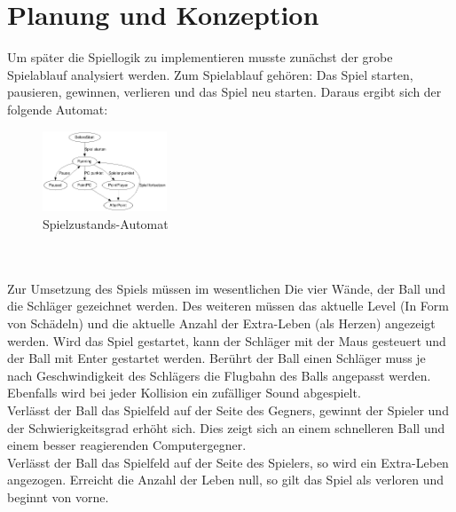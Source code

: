 
\section{Planung und Konzeption}
Um später die Spiellogik zu implementieren musste zunächst der grobe Spielablauf analysiert werden. Zum Spielablauf gehören: Das Spiel starten, pausieren, gewinnen, verlieren und das Spiel neu starten. Daraus ergibt sich der folgende Automat:\\
\begin{figure}[ht]
	\centering
\includegraphics[width=0.33\textwidth]{fsm.png}
\caption{Spielzustands-Automat}
\end{figure}\\\\
Zur Umsetzung des Spiels müssen im wesentlichen Die vier Wände, der Ball und die Schläger gezeichnet werden. Des weiteren müssen das aktuelle Level (In Form von Schädeln) und die aktuelle Anzahl der Extra-Leben (als Herzen) angezeigt werden. Wird das Spiel gestartet, kann der Schläger mit der Maus gesteuert und der Ball mit Enter gestartet werden. Berührt der Ball einen Schläger muss je nach Geschwindigkeit des Schlägers die Flugbahn des Balls angepasst werden. Ebenfalls wird bei jeder Kollision ein zufälliger Sound abgespielt. \\
Verlässt der Ball das Spielfeld auf der Seite des Gegners, gewinnt der Spieler und der Schwierigkeitsgrad erhöht sich. Dies zeigt sich an einem schnelleren Ball und einem besser reagierenden Computergegner.\\
Verlässt der Ball das Spielfeld auf der Seite des Spielers, so wird ein Extra-Leben angezogen. Erreicht die Anzahl der Leben null, so gilt das Spiel als verloren und beginnt von vorne.